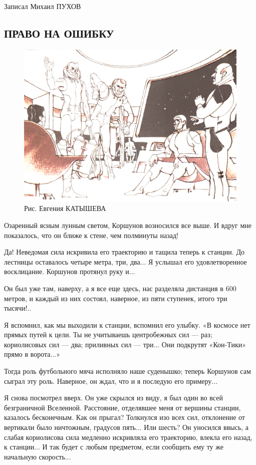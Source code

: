 \documentclass[11pt,a4paper,oneside]{article}
\begin{document}
Записал Михаил ПУХОВ

\subsection{ПРАВО НА ОШИБКУ}
\label{right_to_mistake}
\begin{figure}[H]
\includegraphics[width=\textwidth]{right_to_mistake}
\caption{Рис. Евгения КАТЫШЕВА}
\end{figure}

Озаренный ясным лунным светом, Коршунов возносился все выше. И вдруг мне показалось, что он ближе к стене, чем полминуты назад!

Да! Неведомая сила искривила его траекторию и тащила теперь к станции. До лестницы оставалось четыре метра, три, два... Я услышал его удовлетворенное восклицание. Коршунов протянул руку и...

Он был уже там, наверху, а я все еще здесь, нас разделяла дистанция в 600 метров, и каждый из них состоял, наверное, из пяти ступенек, итого три тысячи!..

Я вспомнил, как мы выходили к станции, вспомнил его улыбку. «В космосе нет прямых путей к цели. Ты не учитываешь центробежных сил — раз; кориолисовых сил — два; приливных сил — три... Они подкрутят «Кон-Тики» прямо в ворота...»

Тогда роль футбольного мяча исполняло наше суденышко; теперь Коршунов сам сыграл эту роль. Наверное, он ждал, что и я последую его примеру...

Я снова посмотрел вверх. Он уже скрылся из виду, я был один во всей безграничной Вселенной. Расстояние, отделявшее меня от вершины станции, казалось бесконечным. Как он прыгал? Толкнулся изо всех сил, отклонение от вертикали было ничтожным, градусов пять... Или шесть? Он уносился ввысь, а слабая кориолисова сила медленно искривляла его траекторию, влекла его назад, к станции... И так будет с любым предметом, если сообщить ему ту же начальную скорость...
\end{document}

